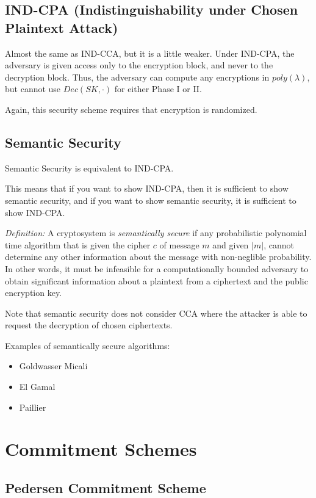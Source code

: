 \documentclass[psamsfonts]{amsart}
\begin{document}
\subsection{IND-CPA (Indistinguishability under Chosen Plaintext Attack)}

Almost the same as IND-CCA, but it is a little weaker. Under IND-CPA, the adversary is given access only to the encryption block, and never to the decryption block. Thus, the adversary can compute any encryptions in $poly(\lambda)$, but cannot use $Dec(SK, \cdot)$ for either Phase I or II.

Again, this security scheme requires that encryption is randomized.

\subsection{Semantic Security}

Semantic Security is equivalent to IND-CPA.

This means that if you want to show IND-CPA, then it is sufficient to show semantic security, and if you want to show semantic security, it is sufficient to show IND-CPA.

\emph{Definition:} A cryptosystem is \emph{semantically secure} if any probabilistic polynomial time algorithm that is given the cipher $c$ of message $m$ and given $|m|$, cannot determine any other information about the message with non-neglible probability. In other words, it must be infeasible for a computationally bounded adversary to obtain significant information about a plaintext from a ciphertext and the public encryption key.

Note that semantic security does not consider CCA where the attacker is able to request the decryption of chosen ciphertexts.

Examples of semantically secure algorithms:
\begin{itemize}
  \item Goldwasser Micali
  \item El Gamal
  \item Paillier
\end{itemize}

\section{Commitment Schemes}

\subsection{Pedersen Commitment Scheme}
\end{document}
